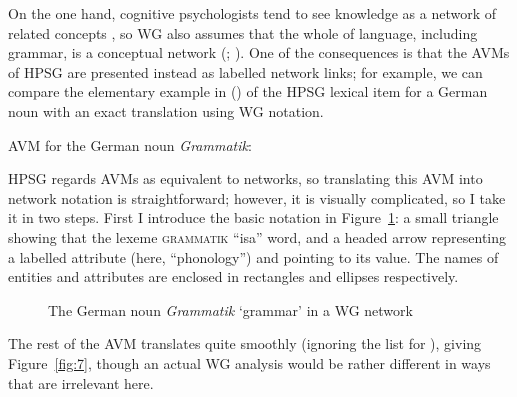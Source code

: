 \documentclass[output=paper
	        ,collection
	        ,collectionchapter
 	        ,biblatex
                ,babelshorthands
                ,newtxmath
                ,draftmode
                ,colorlinks, citecolor=brown
]{./langsci/langscibook}
\begin{document}
On the one hand, cognitive psychologists tend to see knowledge as a network of related concepts \citep[252]{Reisberg2007}, so WG also assumes that the whole of language, including grammar, is a conceptual network (\citealt[1]{Hudson84a-u}; \citeyear[1]{Hudson2007a-u}). One of the consequences is that the AVMs of HPSG are presented instead as labelled network links; for example, we can compare the elementary example in () of the HPSG lexical item for a German noun \citep[264]{MuellerGT-Eng2} with an exact translation using WG notation.

\ea
\label{fig:5}
AVM for the German noun \emph{Grammatik}:\\
\z

HPSG regards AVMs as equivalent to networks, so translating this AVM into network notation is straightforward; however, it is visually complicated, so I take it in two steps. First I introduce the basic notation in Figure~\ref{fig:6}: a small triangle showing that the lexeme \textsc{grammatik} ``isa'' word, and a headed arrow representing a labelled attribute (here, ``phonology'') and pointing to its value. The names of entities and attributes are enclosed in rectangles and ellipses respectively.

\begin{figure}
	\centering
{}
	\caption{The German noun \emph{Grammatik} ‘grammar’ in a WG network}
	\label{fig:6}
\end{figure}

The rest of the AVM translates quite smoothly (ignoring the list for \spr), giving Figure~\ref{fig:7}, though an actual WG analysis would be rather different in ways that are irrelevant here.
\end{document}
